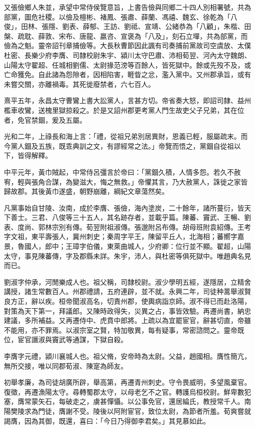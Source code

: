 \begin{pinyinscope}
又張儉鄉人朱並，承望中常侍侯覽意旨，上書告儉與同鄉二十四人別相署號，共為部黨，圖危社稷。以儉及檀彬、褚鳳、張肅、薛蘭、馮禧、魏玄、徐乾為「八俊」，田林、張隱、劉表、薛郁、王訪、劉祗、宣靖、公緒恭為「八顧」，朱楷、田槃、疏耽、薛敦、宋布、唐龍、嬴咨、宣褒為「八及」，刻石立墠，共為部黨，而儉為之魁。靈帝詔刊章捕儉等。大長秋曹節因此諷有司奏捕前黨故司空虞放、太僕杜密、長樂少府李膺、司隸校尉朱宇、潁川太守巴肅、沛相荀翌、河內太守魏朗、山陽太守翟超、任城相劉儒、太尉掾范滂等百餘人，皆死獄中。餘或先歿不及，或亡命獲免。自此諸為怨隙者，因相陷害，睚眥之忿，濫入黨中。又州郡承旨，或有未嘗交關，亦離禍毒。其死徙廢禁者，六七百人。

熹平五年，永昌太守曹鸞上書大訟黨人，言甚方切。帝省奏大怒，即詔司隸、益州檻車收鸞，送槐里獄掠殺之。於是又詔州郡更考黨人門生故吏父子兄弟，其在位者，免官禁錮，爰及五屬。

光和二年，上祿長和海上言：「禮，從祖兄弟別居異財，恩義已輕，服屬疏末。而今黨人錮及五族，既乖典訓之文，有謬經常之法。」帝覽而悟之，黨錮自從祖以下，皆得解釋。

中平元年，黃巾賊起，中常侍呂彊言於帝曰：「黨錮久積，人情多怨。若久不赦宥，輕與張角合謀，為變滋大，悔之無救。」帝懼其言，乃大赦黨人，誅徙之家皆歸故郡。其後黃巾遂盛，朝野崩離，綱紀文章蕩然矣。

凡黨事始自甘陵、汝南，成於李膺、張儉，海內塗炭，二十餘年，諸所蔓衍，皆天下善士。三君、八俊等三十五人，其名跡存者，並載乎篇。陳蕃、竇武、王暢、劉表、度尚、郭林宗別有傳。荀翌附祖淑傳。張邈附呂布傳。胡母班附袁紹傳。王考字文祖，東平壽張人，冀州刺史；秦周字平王，陳留平丘人，北海相；蕃嚮字嘉景，魯國人，郎中；王璋字伯儀，東萊曲城人，少府卿：位行並不顯。翟超，山陽太守，事見陳蕃傳，字及郡縣未詳。朱宇，沛人，與杜密等俱死獄中。唯趙典名見而已。

劉淑字仲承，河閒樂成人也。祖父稱，司隸校尉。淑少學明五經，遂隱居，立精舍講授，諸生常數百人。州郡禮請，五府連辟，並不就。永興二年，司徒种暠舉淑賢良方正，辭以疾。桓帝聞淑高名，切責州郡，使輿病詣京師。淑不得已而赴洛陽，對策為天下第一，拜議郎。又陳時政得失，災異之占，事皆效驗。再遷尚書，納忠建議，多所補益。又再遷侍中、虎賁中郎將。上疏以為宜罷宦官，辭甚切直，帝雖不能用，亦不罪焉。以淑宗室之賢，特加敬異，每有疑事，常密諮問之。靈帝既位，宦官譖淑與竇武等通謀，下獄自殺。

李膺字元禮，潁川襄城人也。祖父脩，安帝時為太尉。父益，趙國相。膺性簡亢，無所交接，唯以同郡荀淑、陳寔為師友。

初舉孝廉，為司徒胡廣所辟，舉高第，再遷青州刺史。守令畏威明，多望風棄官。復徵，再遷漁陽太守。尋轉蜀郡太守，以母老乞不之官。轉護烏桓校尉。鮮卑數犯塞，膺常蒙矢石，每破走之，虜甚憚懾。以公事免官，還居綸氏，教授常千人。南陽樊陵求為門徒，膺謝不受。陵後以阿附宦官，致位太尉，為節者所羞。荀爽嘗就謁膺，因為其御，既還，喜曰：「今日乃得御李君矣。」其見慕如此。


\end{pinyinscope}
